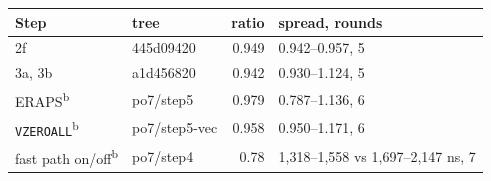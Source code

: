 \begin{tabular}{@{}llrl@{}}
\toprule
Step & tree & ratio & spread, rounds \\
\midrule
2f & 445d09420 & 0.949 & 0.942--0.957, 5 \\
3a, 3b & a1d456820 & 0.942 & 0.930--1.124, 5 \\
ERAPS\textsuperscript{b} & po7/step5 & 0.979 & 0.787--1.136, 6 \\
\texttt{VZEROALL}\textsuperscript{b} & po7/step5-vec & 0.958 & 0.950--1.171, 6 \\
fast path on/off\textsuperscript{b} & po7/step4 & 0.78 & 1,318--1,558 vs 1,697--2,147 ns, 7 \\
\bottomrule
\end{tabular}
